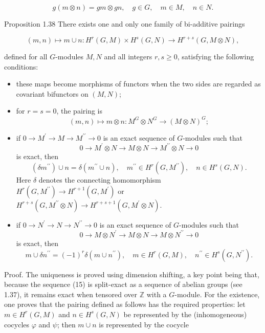 \documentclass[10pt]{article}
\begin{document}
$$
g(m \otimes n)=g m \otimes g n, \quad g \in G, \quad m \in M, \quad n \in N .
$$

Proposition 1.38 There exists one and only one family of bi-additive pairings

$$
(m, n) \mapsto m \cup n: H^{r}(G, M) \times H^{s}(G, N) \rightarrow H^{r+s}(G, M \otimes N),
$$

defined for all $G$-modules $M, N$ and all integers $r, s \geq 0$, satisfying the following conditions:

\begin{itemize}
  \item[(a)] these maps become morphisms of functors when the two sides are regarded as covariant bifunctors on $(M, N)$;
  \item[(b)] for $r=s=0$, the pairing is
$$
(m, n) \mapsto m \otimes n: M^{G} \otimes N^{G} \rightarrow(M \otimes N)^{G} ;
$$
  \item[(c)] if $0 \rightarrow M^{\prime} \rightarrow M \rightarrow M^{\prime \prime} \rightarrow 0$ is an exact sequence of $G$-modules such that
$$
0 \rightarrow M^{\prime} \otimes N \rightarrow M \otimes N \rightarrow M^{\prime \prime} \otimes N \rightarrow 0
$$
is exact, then
$$
\left(\delta m^{\prime \prime}\right) \cup n=\delta\left(m^{\prime \prime} \cup n\right), \quad m^{\prime \prime} \in H^{r}\left(G, M^{\prime \prime}\right), \quad n \in H^{s}(G, N) .
$$
Here $\delta$ denotes the connecting homomorphism $H^{r}\left(G, M^{\prime \prime}\right) \rightarrow H^{r+1}\left(G, M^{\prime}\right)$ or $H^{r+s}\left(G, M^{\prime \prime} \otimes N\right) \rightarrow H^{r+s+1}\left(G, M^{\prime} \otimes N\right)$.
  \item[(d)] if $0 \rightarrow N^{\prime} \rightarrow N \rightarrow N^{\prime \prime} \rightarrow 0$ is an exact sequence of $G$-modules such that
$$
0 \rightarrow M \otimes N^{\prime} \rightarrow M \otimes N \rightarrow M \otimes N^{\prime \prime} \rightarrow 0
$$
is exact, then
$$
m \cup \delta n^{\prime \prime}=(-1)^{r} \delta\left(m \cup n^{\prime \prime}\right), \quad m \in H^{r}(G, M), \quad n^{\prime \prime} \in H^{s}\left(G, N^{\prime \prime}\right) .
$$
\end{itemize}

Proof. The uniqueness is proved using dimension shifting, a key point being that, because the sequence (15) is split-exact as a sequence of abelian groups (see 1.37), it remains exact when tensored over $\mathbb{Z}$ with a $G$-module. For the existence, one proves that the pairing defined as follows has the required properties: let $m \in H^{r}(G, M)$ and $n \in H^{s}(G, N)$ be represented by the (inhomogeneous) cocycles $\varphi$ and $\psi$; then $m \cup n$ is represented by the cocycle
\end{document}
